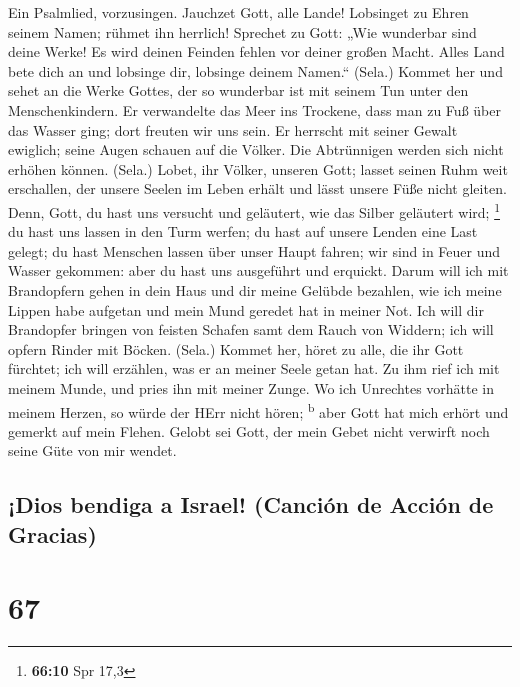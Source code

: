  Ein Psalmlied, vorzusingen. Jauchzet Gott, alle Lande!
 Lobsinget zu Ehren seinem Namen; rühmet ihn herrlich!
 Sprechet zu Gott: „Wie wunderbar sind deine Werke! Es
wird deinen Feinden fehlen vor deiner großen Macht.  Alles
Land bete dich an und lobsinge dir, lobsinge deinem Namen.`` (Sela.)
 Kommet her und sehet an die Werke Gottes, der so
wunderbar ist mit seinem Tun unter den Menschenkindern. 
Er verwandelte das Meer ins Trockene, dass man zu Fuß über das Wasser
ging; dort freuten wir uns sein.  Er herrscht mit seiner
Gewalt ewiglich; seine Augen schauen auf die Völker. Die Abtrünnigen
werden sich nicht erhöhen können. (Sela.)  Lobet, ihr
Völker, unseren Gott; lasset seinen Ruhm weit erschallen, 
der unsere Seelen im Leben erhält und lässt unsere Füße nicht gleiten.
 Denn, Gott, du hast uns versucht und geläutert, wie das
Silber geläutert wird; \footnote{\textbf{66:10} Spr 17,3}
 du hast uns lassen in den Turm werfen; du hast auf
unsere Lenden eine Last gelegt;  du hast Menschen lassen
über unser Haupt fahren; wir sind in Feuer und Wasser gekommen: aber du
hast uns ausgeführt und erquickt.  Darum will ich mit
Brandopfern gehen in dein Haus und dir meine Gelübde bezahlen,
 wie ich meine Lippen habe aufgetan und mein Mund geredet
hat in meiner Not.  Ich will dir Brandopfer bringen von
feisten Schafen samt dem Rauch von Widdern; ich will opfern Rinder mit
Böcken. (Sela.)  Kommet her, höret zu alle, die ihr Gott
fürchtet; ich will erzählen, was er an meiner Seele getan hat.
 Zu ihm rief ich mit meinem Munde, und pries ihn mit
meiner Zunge.  Wo ich Unrechtes vorhätte in meinem
Herzen, so würde der HErr nicht hören; \textsuperscript{b}
 aber Gott hat mich erhört und gemerkt auf mein Flehen.
 Gelobt sei Gott, der mein Gebet nicht verwirft noch
seine Güte von mir wendet.

\hypertarget{dios-bendiga-a-israel-canciuxf3n-de-acciuxf3n-de-gracias}{%
\subsection{¡Dios bendiga a Israel! (Canción de Acción de
Gracias)}\label{dios-bendiga-a-israel-canciuxf3n-de-acciuxf3n-de-gracias}}

\hypertarget{section-66}{%
\section{67}\label{section-66}}

